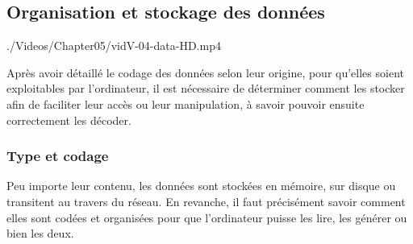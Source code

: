 \subsection[Organisation et stockage]{Organisation et stockage des données}
\label{sub:V.3.2}

\begin{marginvideo}%
		{./Videos/Chapter05/vidV-04-data-HD.mp4}%
\end{marginvideo}

Après avoir détaillé le codage des données selon leur origine, pour qu'elles soient exploitables par l'ordinateur, il est nécessaire de déterminer comment les stocker afin de faciliter leur accès ou leur manipulation, à savoir pouvoir ensuite correctement les décoder.

\subsubsection[Type et codage]{Type et codage}
\label{subsub:V.3.2.1}

Peu importe leur contenu, les données sont stockées en mémoire, sur disque ou transitent au travers du réseau. En revanche, il faut précisément savoir comment elles sont codées et organisées pour que l'ordinateur puisse les lire, les générer ou bien les deux.

